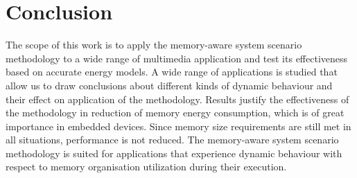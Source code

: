 \documentclass[a4paper,conference]{IEEEtran}
\begin{document}
\section{Conclusion}
\label{sec:conclusion}

The scope of this work is to apply the memory-aware system scenario methodology to a wide range of multimedia application and test its effectiveness based on accurate energy models. A wide range of applications is studied that allow us to draw conclusions about different kinds of dynamic behaviour and their effect on application of the methodology. Results justify the effectiveness of the methodology in reduction of memory energy consumption, which is of great importance in embedded devices. Since memory size requirements are still met in all situations, performance is not reduced. The memory-aware system scenario methodology is suited for applications that experience dynamic behaviour with respect to memory organisation utilization during their execution.



%

\end{document}
